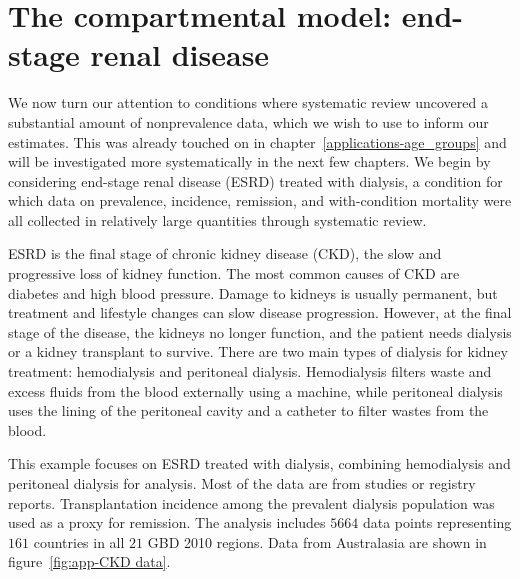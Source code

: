 \chapter{The compartmental model: end-stage renal disease}
\label{applications-fits_incon_v_con}

We now turn our attention to conditions where systematic review
uncovered a substantial amount of nonprevalence data, which we wish
to use to inform our estimates.  This was already touched on in
chapter~\ref{applications-age_groups} and will be investigated more
systematically in the next few chapters.  We begin by considering
end-stage renal disease (ESRD) treated with dialysis, a condition for which data on
prevalence, incidence, remission, and with-condition mortality were
all collected in relatively large quantities through systematic
review.

ESRD is the final stage of chronic kidney disease (CKD), the slow and
progressive loss of kidney function.  The most common causes of CKD
are diabetes and high blood pressure.  Damage to kidneys is usually
permanent, but treatment and lifestyle changes can slow disease progression.  However, at the final stage of the disease, the kidneys no longer function,
and the patient needs dialysis or a kidney transplant to survive.
There are two main types of
dialysis for kidney treatment: hemodialysis and peritoneal dialysis.
Hemodialysis filters waste and excess fluids from the blood
externally using a machine, while peritoneal dialysis uses the lining
of the peritoneal cavity and a catheter to filter wastes from the
blood. \cite{_k/doqi_2002, dipiro_pharmacotherapy:_2008}

This example focuses on ESRD treated with dialysis, combining hemodialysis
and peritoneal dialysis for analysis.
Most of the data are from studies or registry reports.
Transplantation incidence among the prevalent
dialysis population was used as a proxy for remission.  The analysis
includes $5664$ data points representing $161$ countries in
all $21$ GBD 2010 regions.  Data from Australasia are shown in
figure~\ref{fig:app-CKD data}.


